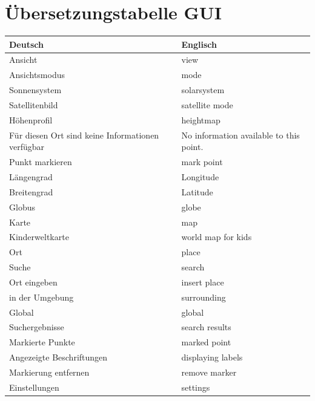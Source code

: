 \documentclass[10pt]{scrreprt}
\begin{document}
\section{Übersetzungstabelle GUI}
\begin{longtable}{|p{7.5cm}|p{7.5cm}|}
\hline 
\rule[-1ex]{0pt}{4ex} \textbf{Deutsch} & \textbf{Englisch} \\ 
\hline
\hline 
\rule[-1ex]{0pt}{4ex} Ansicht & view \\ 
\hline
\rule[-1ex]{0pt}{4ex} Ansichtsmodus & mode \\ 
\hline
\rule[-1ex]{0pt}{4ex} Sonnensystem & solarsystem \\
\hline
\rule[-1ex]{0pt}{4ex} Satellitenbild & satellite mode \\
\hline
\rule[-1ex]{0pt}{4ex} Höhenprofil & heightmap \\
\hline
\rule[-1ex]{0pt}{4ex} Für diesen Ort sind keine Informationen verfügbar & No information available to this point. \\
\hline
\rule[-1ex]{0pt}{4ex} Punkt markieren & mark point\\
\hline
\rule[-1ex]{0pt}{4ex} Längengrad & Longitude \\
\hline
\rule[-1ex]{0pt}{4ex} Breitengrad & Latitude \\
\hline
\rule[-1ex]{0pt}{4ex} Globus & globe \\
\hline
\rule[-1ex]{0pt}{4ex} Karte & map \\
\hline
\rule[-1ex]{0pt}{4ex} Kinderweltkarte & world map for kids \\
\hline
\rule[-1ex]{0pt}{4ex} Ort & place \\
\hline
\rule[-1ex]{0pt}{4ex} Suche & search \\
\hline
\rule[-1ex]{0pt}{4ex} Ort eingeben & insert place \\
\hline
\rule[-1ex]{0pt}{4ex} in der Umgebung & surrounding \\
\hline
\rule[-1ex]{0pt}{4ex} Global & global \\
\hline
\rule[-1ex]{0pt}{4ex} Suchergebnisse & search results \\
\hline
\rule[-1ex]{0pt}{4ex} Markierte Punkte & marked point \\
\hline
\rule[-1ex]{0pt}{4ex} Angezeigte Beschriftungen & displaying labels \\
\hline
\rule[-1ex]{0pt}{4ex} Markierung entfernen & remove marker \\
\hline
\rule[-1ex]{0pt}{4ex} Einstellungen & settings \\

\end{longtable}
\end{document}
